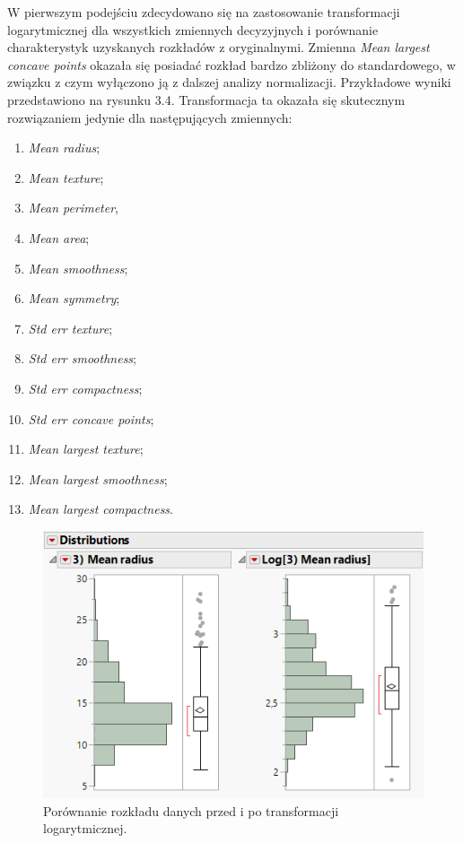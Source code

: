 	\newpage
	
	W pierwszym podejściu zdecydowano się na zastosowanie transformacji logarytmicznej dla wszystkich zmiennych decyzyjnych i porównanie charakterystyk uzyskanych rozkładów z oryginalnymi. Zmienna \textit{Mean largest concave points} okazała się posiadać rozkład bardzo zbliżony do standardowego, w związku z czym wyłączono ją z dalszej analizy normalizacji. Przykładowe wyniki przedstawiono na rysunku 3.4. Transformacja ta okazała się skutecznym rozwiązaniem jedynie dla następujących zmiennych:
	
	\begin{enumerate}
		\item \textit{Mean radius};
		\item \textit{Mean texture};
		\item \textit{Mean perimeter},
		\item \textit{Mean area};
		\item \textit{Mean smoothness};
		\item \textit{Mean symmetry};
		\item \textit{Std err texture};
		\item \textit{Std err smoothness};
		\item \textit{Std err compactness};
		\item \textit{Std err concave points};
		\item \textit{Mean largest texture};
		\item \textit{Mean largest smoothness};
		\item \textit{Mean largest compactness}.
	\end{enumerate}

	\begin{figure}[!ht]
		\centering
		\includegraphics[width=0.7\linewidth]{Rysunki/Rozdzial3/log}
		\caption{Porównanie rozkładu danych przed i po transformacji logarytmicznej.}
		\label{fig:log}
	\end{figure}
	
